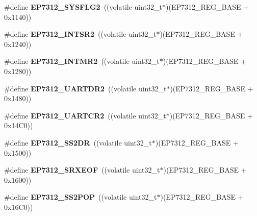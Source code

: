 \begin{DoxyCompactItemize}
\#define {\bfseries E\+P7312\+\_\+\+S\+Y\+S\+F\+L\+G2}~((volatile uint32\+\_\+t$\ast$)(E\+P7312\+\_\+\+R\+E\+G\+\_\+\+B\+A\+SE + 0x1140))
\item 
\mbox{\label{group__edb7312__registers_ga5abfeea9bf875659469dc919acd94021}} 
\#define {\bfseries E\+P7312\+\_\+\+I\+N\+T\+S\+R2}~((volatile uint32\+\_\+t$\ast$)(E\+P7312\+\_\+\+R\+E\+G\+\_\+\+B\+A\+SE + 0x1240))
\item 
\mbox{\label{group__edb7312__registers_ga24716d79fd9fdb6253566b01757680c4}} 
\#define {\bfseries E\+P7312\+\_\+\+I\+N\+T\+M\+R2}~((volatile uint32\+\_\+t$\ast$)(E\+P7312\+\_\+\+R\+E\+G\+\_\+\+B\+A\+SE + 0x1280))
\item 
\mbox{\label{group__edb7312__registers_ga58e4ef889ef089fc785d6c69f04a7109}} 
\#define {\bfseries E\+P7312\+\_\+\+U\+A\+R\+T\+D\+R2}~((volatile uint32\+\_\+t$\ast$)(E\+P7312\+\_\+\+R\+E\+G\+\_\+\+B\+A\+SE + 0x1480))
\item 
\mbox{\label{group__edb7312__registers_ga2ba05f258aa1b23a5d96e03a55f98993}} 
\#define {\bfseries E\+P7312\+\_\+\+U\+A\+R\+T\+C\+R2}~((volatile uint32\+\_\+t$\ast$)(E\+P7312\+\_\+\+R\+E\+G\+\_\+\+B\+A\+SE + 0x14\+C0))
\item 
\mbox{\label{group__edb7312__registers_ga107e80628026f73bff70b6e30a2b8f5b}} 
\#define {\bfseries E\+P7312\+\_\+\+S\+S2\+DR}~((volatile uint32\+\_\+t$\ast$)(E\+P7312\+\_\+\+R\+E\+G\+\_\+\+B\+A\+SE + 0x1500))
\item 
\mbox{\label{group__edb7312__registers_ga06c283c12e544d3d416e7b73c2071c51}} 
\#define {\bfseries E\+P7312\+\_\+\+S\+R\+X\+E\+OF}~((volatile uint32\+\_\+t$\ast$)(E\+P7312\+\_\+\+R\+E\+G\+\_\+\+B\+A\+SE + 0x1600))
\item 
\mbox{\label{group__edb7312__registers_ga135ada37472568747845b5f4c2f7355c}} 
\#define {\bfseries E\+P7312\+\_\+\+S\+S2\+P\+OP}~((volatile uint32\+\_\+t$\ast$)(E\+P7312\+\_\+\+R\+E\+G\+\_\+\+B\+A\+SE + 0x16\+C0))
\item 
\mbox{\label{group__edb7312__registers_ga7956476b713a044e94dff0457acdb578}} 

\end{DoxyCompactItemize}
